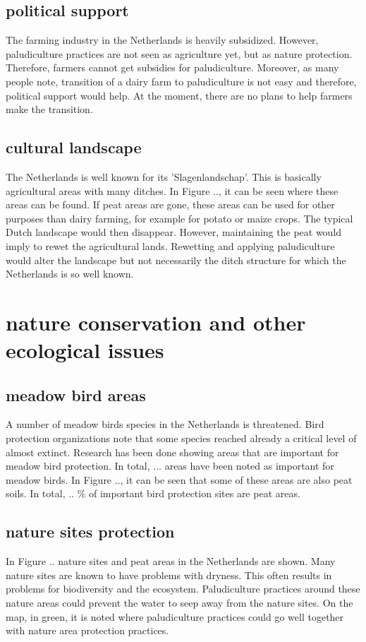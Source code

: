 \documentclass[a4paper,12pt]{scrbook}
\begin{document}
{\subsection{political support}  
The farming industry in the Netherlands is heavily subsidized. However, paludiculture practices are not seen as agriculture yet, but as nature protection. Therefore, farmers cannot get subsidies for paludiculture. Moreover, as many people note, transition of a dairy farm to paludiculture is not easy and therefore, political support would help. At the moment, there are no plans to help farmers make the transition.

\subsection{cultural landscape}
The Netherlands is well known for its 'Slagenlandschap'. This is basically agricultural areas with many ditches. In Figure .., it can be seen where these areas can be found. If peat areas are gone, these areas can be used for other purposes than dairy farming, for example for potato or maize crops. The typical Dutch landscape would then disappear. However, maintaining the peat would imply to rewet the agricultural lands. Rewetting and applying paludiculture would alter the landscape but not necessarily the ditch structure for which the Netherlands is so well known. 

\section{nature conservation and other ecological issues}

\subsection{meadow bird areas}
A number of meadow birds species in the Netherlands is threatened. Bird protection organizations note that some species reached already a critical level of almost extinct. Research has been done showing areas that are important for meadow bird protection. In total, ... areas have been noted as important for meadow birds. In Figure .., it can be seen that some of these areas are also peat soils. In total, .. \% of important bird protection sites are peat areas. 

\subsection{nature sites protection}
In Figure .. nature sites and peat areas in the Netherlands are shown. Many nature sites are known to have problems with dryness. This often results in problems for biodiversity and the ecosystem. Paludiculture practices around these nature areas could prevent the water to seep away from the nature sites. On the map, in green, it is noted where paludiculture practices could go well together with nature area protection practices.

}
\end{document}
